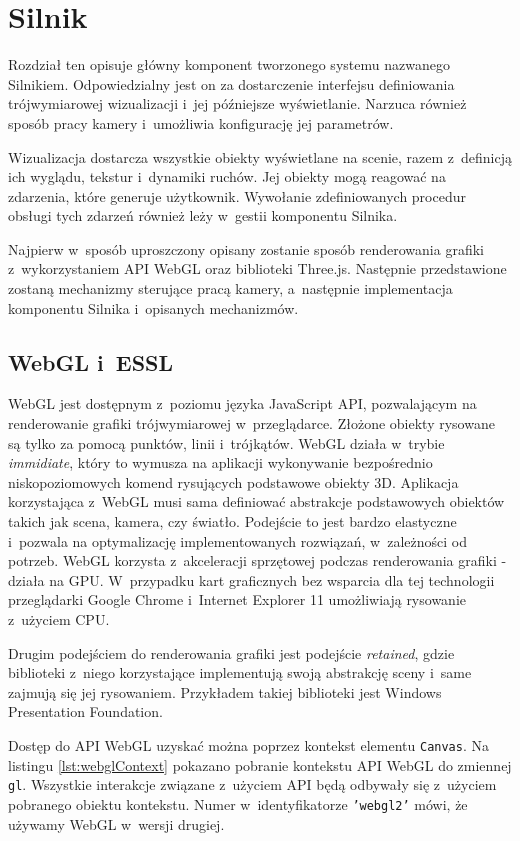 \chapter{Silnik}

Rozdział ten opisuje główny komponent tworzonego systemu nazwanego Silnikiem. Odpowiedzialny jest on za dostarczenie interfejsu definiowania trójwymiarowej wizualizacji i~jej późniejsze wyświetlanie. Narzuca również sposób pracy kamery i~umożliwia konfigurację jej parametrów.

Wizualizacja dostarcza wszystkie obiekty wyświetlane na scenie, razem z~definicją ich wyglądu, tekstur i~dynamiki ruchów. Jej obiekty mogą reagować na zdarzenia, które generuje użytkownik. Wywołanie zdefiniowanych procedur obsługi tych zdarzeń również leży w~gestii komponentu Silnika.

Najpierw w~sposób uproszczony opisany zostanie sposób renderowania grafiki z~wykorzystaniem API WebGL oraz biblioteki Three.js. Następnie przedstawione zostaną mechanizmy sterujące pracą kamery, a~następnie implementacja komponentu Silnika i~opisanych mechanizmów.

\section{WebGL i~ESSL}

WebGL jest dostępnym z~poziomu języka JavaScript API, pozwalającym na renderowanie grafiki trójwymiarowej w~przeglądarce. Złożone obiekty rysowane są tylko za pomocą punktów, linii i~trójkątów.  WebGL działa w~trybie \textit{immidiate}, który to wymusza na aplikacji wykonywanie bezpośrednio niskopoziomowych komend rysujących podstawowe obiekty 3D. Aplikacja korzystająca z~WebGL musi sama definiować abstrakcje podstawowych obiektów takich jak scena, kamera, czy światło. Podejście to jest bardzo elastyczne i~pozwala na optymalizację implementowanych rozwiązań, w~zależności od potrzeb\cite[Rozdział 1]{RealTime3DGraphics}. WebGL korzysta z~akceleracji sprzętowej podczas renderowania grafiki - działa na GPU. W~przypadku kart graficznych bez wsparcia dla tej technologii przeglądarki Google Chrome i~Internet Explorer 11 umożliwiają rysowanie z~użyciem CPU.

Drugim podejściem do renderowania grafiki jest podejście \textit{retained}, gdzie biblioteki z~niego korzystające implementują swoją abstrakcję sceny i~same zajmują się jej rysowaniem. Przykładem takiej biblioteki jest Windows Presentation Foundation\cite{WPF}.

Dostęp do API WebGL uzyskać można poprzez kontekst elementu \texttt{Canvas}. Na listingu \ref{lst:webglContext} pokazano pobranie kontekstu API WebGL do zmiennej \texttt{gl}. Wszystkie interakcje związane z~użyciem API będą odbywały się z~użyciem pobranego obiektu kontekstu. Numer w~identyfikatorze \texttt{’webgl2’} mówi, że używamy WebGL w~wersji drugiej.

